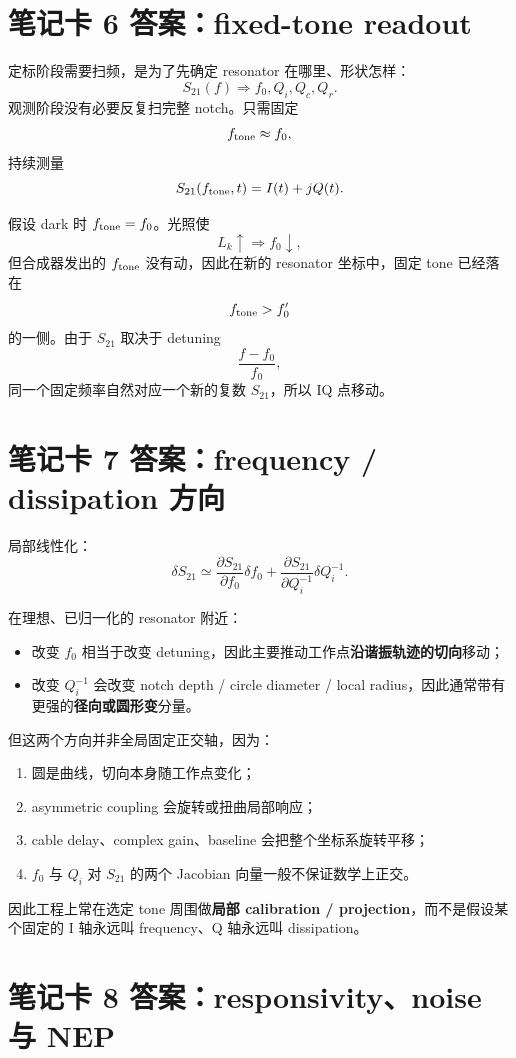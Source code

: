 \documentclass[11pt,a4paper,openany]{ctexrep}
\begin{document}
\section{笔记卡 6 答案：fixed-tone readout}

定标阶段需要扫频，是为了先确定 resonator 在哪里、形状怎样：
\[
S_{21}(f)\Rightarrow f_0,Q_i,Q_c,Q_r.
\]
观测阶段没有必要反复扫完整 notch。只需固定
\[
f_{\rm tone}\approx f_0,
\]
持续测量
\[
S_{21}(f_{\rm tone},t)=I(t)+jQ(t).
\]

假设 dark 时 $f_{\rm tone}=f_0$。光照使
\[
L_k\uparrow\Rightarrow f_0\downarrow,
\]
但合成器发出的 $f_{\rm tone}$ 没有动，因此在新的 resonator 坐标中，固定 tone 已经落在
\[
f_{\rm tone}>f_0'
\]
的一侧。由于 $S_{21}$ 取决于 detuning
\[
\frac{f-f_0}{f_0},
\]
同一个固定频率自然对应一个新的复数 $S_{21}$，所以 IQ 点移动。

\section{笔记卡 7 答案：frequency / dissipation 方向}

局部线性化：
\[
\delta S_{21}
\simeq
\frac{\partial S_{21}}{\partial f_0}\delta f_0
+
\frac{\partial S_{21}}{\partial Q_i^{-1}}\delta Q_i^{-1}.
\]

在理想、已归一化的 resonator 附近：
\begin{itemize}
  \item 改变 $f_0$ 相当于改变 detuning，因此主要推动工作点\textbf{沿谐振轨迹的切向}移动；
  \item 改变 $Q_i^{-1}$ 会改变 notch depth / circle diameter / local radius，因此通常带有更强的\textbf{径向或圆形变}分量。
\end{itemize}

但这两个方向并非全局固定正交轴，因为：
\begin{enumerate}
  \item 圆是曲线，切向本身随工作点变化；
  \item asymmetric coupling 会旋转或扭曲局部响应；
  \item cable delay、complex gain、baseline 会把整个坐标系旋转平移；
  \item $f_0$ 与 $Q_i$ 对 $S_{21}$ 的两个 Jacobian 向量一般不保证数学上正交。
\end{enumerate}
因此工程上常在选定 tone 周围做\textbf{局部 calibration / projection}，而不是假设某个固定的 I 轴永远叫 frequency、Q 轴永远叫 dissipation。

\section{笔记卡 8 答案：responsivity、noise 与 NEP}
\end{document}
